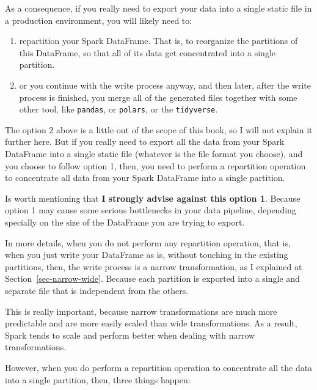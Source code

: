 \documentclass[
  11pt,
  letterpaper,
  DIV=11,
  numbers=noendperiod]{scrreprt}
\providecommand{\tightlist}{%
  \setlength{\itemsep}{0pt}\setlength{\parskip}{0pt}}\usepackage{longtable,booktabs,array}
\begin{document}
As a consequence, if you really need to export your data into a single
static file in a production environment, you will likely need to:

\begin{enumerate}
\def\labelenumi{\arabic{enumi}.}
\tightlist
\item
  repartition your Spark DataFrame. That is, to reorganize the
  partitions of this DataFrame, so that all of its data get concentrated
  into a single partition.
\item
  or you continue with the write process anyway, and then later, after
  the write process is finished, you merge all of the generated files
  together with some other tool, like \texttt{pandas}, or
  \texttt{polars}, or the \texttt{tidyverse}.
\end{enumerate}

The option 2 above is a little out of the scope of this book, so I will
not explain it further here. But if you really need to export all the
data from your Spark DataFrame into a single static file (whatever is
the file format you choose), and you choose to follow option 1, then,
you need to perform a repartition operation to concentrate all data from
your Spark DataFrame into a single partition.

Is worth mentioning that \textbf{I strongly advise against this option
1}. Because option 1 may cause some serious bottlenecks in your data
pipeline, depending specially on the size of the DataFrame you are
trying to export.

In more details, when you do not perform any repartition operation, that
is, when you just write your DataFrame as is, without touching in the
existing partitions, then, the write process is a narrow transformation,
as I explained at Section~\ref{sec-narrow-wide}. Because each partition
is exported into a single and separate file that is independent from the
others.

This is really important, because narrow transformations are much more
predictable and are more easily scaled than wide transformations. As a
result, Spark tends to scale and perform better when dealing with narrow
transformations.

However, when you do perform a repartition operation to concentrate all
the data into a single partition, then, three things happen:
\end{document}
